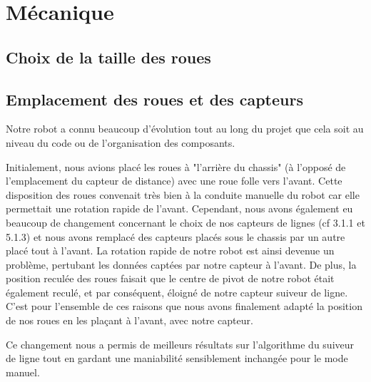\section{Mécanique}
\subsection{Choix de la taille des roues}

\todo

\subsection{Emplacement des roues et des capteurs}
Notre robot a connu beaucoup d'évolution tout au long du projet que cela soit au niveau du code ou de l'organisation des composants.

Initialement, nous avions placé les roues à "l'arrière du chassis" (à l'opposé de l'emplacement du capteur de distance) avec une roue folle vers l'avant. Cette disposition des roues convenait très bien à la conduite manuelle du robot car elle permettait une rotation rapide de l'avant. Cependant, nous avons également eu beaucoup de changement concernant le choix de nos capteurs de lignes (cf 3.1.1 et 5.1.3) et nous avons remplacé des capteurs placés sous le chassis par un autre placé tout à l'avant. La rotation rapide de notre robot est ainsi devenue un problème, pertubant les données captées par notre capteur à l'avant. De plus, la position reculée des roues faisait que le centre de pivot de notre robot était également reculé, et par conséquent, éloigné de notre capteur suiveur de ligne. C'est pour l'ensemble de ces raisons que nous avons finalement adapté la position de nos roues en les plaçant à l'avant, avec notre capteur.

Ce changement nous a permis de meilleurs résultats sur l'algorithme du suiveur de ligne tout en gardant une maniabilité sensiblement inchangée pour le mode manuel.
